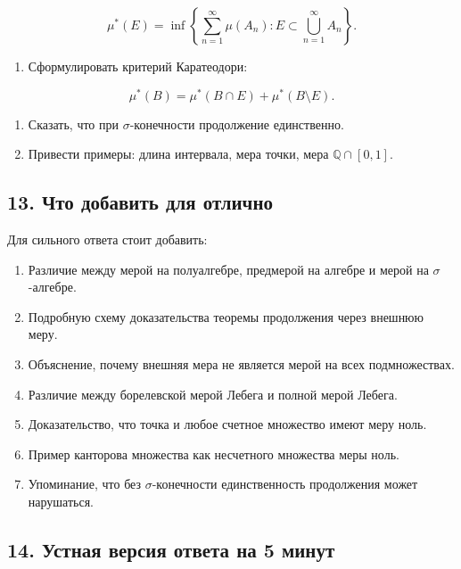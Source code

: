 \documentclass[
  11pt,
  a4paper,
]{article}
\providecommand{\tightlist}{%
  \setlength{\itemsep}{0pt}\setlength{\parskip}{0pt}}
\begin{document}
\[
\mu^*(E)=
\inf\left\{
\sum_{n=1}^{\infty}\mu(A_n):
E\subset\bigcup_{n=1}^{\infty}A_n
\right\}.
\]

\begin{enumerate}
\def\labelenumi{\arabic{enumi}.}
\setcounter{enumi}{2}
\tightlist
\item
  Сформулировать критерий Каратеодори:
\end{enumerate}

\[
\mu^*(B)=\mu^*(B\cap E)+\mu^*(B\setminus E).
\]

\begin{enumerate}
\def\labelenumi{\arabic{enumi}.}
\setcounter{enumi}{3}
\tightlist
\item
  Сказать, что при \(\sigma\)-конечности продолжение единственно.
\item
  Привести примеры: длина интервала, мера точки, мера
  \(\mathbb Q\cap[0,1]\).
\end{enumerate}

\subsection{13. Что добавить для
отлично}\label{ux447ux442ux43e-ux434ux43eux431ux430ux432ux438ux442ux44c-ux434ux43bux44f-ux43eux442ux43bux438ux447ux43dux43e}

Для сильного ответа стоит добавить:

\begin{enumerate}
\def\labelenumi{\arabic{enumi}.}
\tightlist
\item
  Различие между мерой на полуалгебре, предмерой на алгебре и мерой на
  \(\sigma\)-алгебре.
\item
  Подробную схему доказательства теоремы продолжения через внешнюю меру.
\item
  Объяснение, почему внешняя мера не является мерой на всех
  подмножествах.
\item
  Различие между борелевской мерой Лебега и полной мерой Лебега.
\item
  Доказательство, что точка и любое счетное множество имеют меру ноль.
\item
  Пример канторова множества как несчетного множества меры ноль.
\item
  Упоминание, что без \(\sigma\)-конечности единственность продолжения
  может нарушаться.
\end{enumerate}

\subsection{14. Устная версия ответа на 5
минут}\label{ux443ux441ux442ux43dux430ux44f-ux432ux435ux440ux441ux438ux44f-ux43eux442ux432ux435ux442ux430-ux43dux430-5-ux43cux438ux43dux443ux442}
\end{document}
